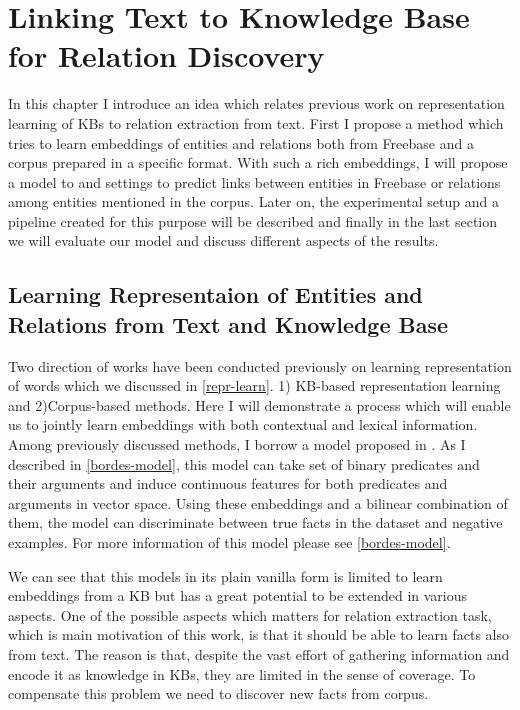 \chapter{Linking Text to Knowledge Base for Relation Discovery}
\label{ch:text-kb}

In this chapter I introduce an idea which relates previous work on
representation learning of KBs to relation extraction from text. First I propose
a method which tries to learn embeddings of entities and relations both from
Freebase and a corpus prepared in a specific format. With such a rich
embeddings, I will propose a model to and settings to predict links between
entities in Freebase or relations among entities mentioned in the corpus.
Later on, the experimental setup and a pipeline created for this purpose will be
described and finally in the last section we will evaluate our model and discuss
different aspects of the results.

\section{Learning Representaion of Entities and Relations
from Text and Knowledge Base}
\label{sec:dataset}

Two direction of works have been conducted previously on learning representation
of words which we discussed in \ref{repr-learn}. 1) KB-based
representation learning and 2)Corpus-based methods. Here I will demonstrate a
process which will enable us to jointly learn embeddings with both contextual
and lexical information. Among previously discussed methods, I borrow a model
proposed in \cite{Bordes2012}. As I described in \ref{bordes-model}, this model
can take set of binary predicates and their arguments and induce continuous
features for both predicates and arguments in vector space. Using these
embeddings and a bilinear combination of them, the model can discriminate
between true facts in the dataset and negative examples. For more information of
this model please see \ref{bordes-model}.

We can see that this models in its plain vanilla form is limited to learn
embeddings from a KB but has a great potential to be extended in various
aspects. One of the possible aspects which matters for relation extraction task,
which is main motivation of this work, is that it should be able to learn facts
also from text. The reason is that, despite the vast effort of gathering
information and encode it as knowledge in KBs, they are limited in the sense of
coverage. To compensate this problem we need to discover new facts from corpus.


